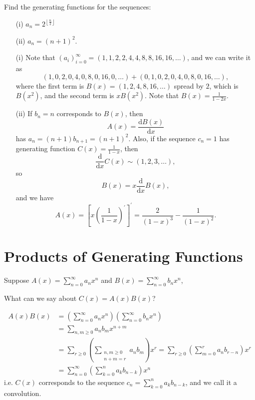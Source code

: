 \begin{eg}
    Find the generating functions for the sequences:
    \begin{itemize}
        \item [(i)] \(a_n = 2^{\left\lfloor \frac{n}{2} \right\rfloor}\)
        \item [(ii)] \(a_n = (n + 1)^2\). 
    \end{itemize}
\end{eg}
\begin{explanation}
    \vphantom{text}
    \begin{itemize}
        \item [(i)] Note that \((a_i)_{i=0}^{\infty} = (1, 1, 2, 2, 4, 4, 8, 8, 16, 16, \dots )\), and we can write it as 
        \[
            (1,0,2,0,4,0,8,0,16,0,\dots ) + (0, 1, 0, 2, 0, 4,0, 8, 0, 16,\dots ),
        \] where the first term is \(B(x) = (1, 2, 4, 8, 16, \dots )\) spread by \(2\), which is \(B \left( x^2 \right) \), and the second term is \(x B \left( x^2 \right) \). Note that \(B(x) = \frac{1}{1 - 2x}\).  
        \item [(ii)] If \(b_n = n\) corresponds to \(B(x)\), then 
        \[
            A(x) = \frac{\mathrm{d}B(x)}{\mathrm{d}x} 
        \] has \(a_n = (n + 1) b_{n+1} = (n+1)^2\). Also, if the sequence \(c_n = 1\) has generating function \(C(x) = \frac{1}{1-x}\), then 
        \[
            \frac{\mathrm{d}}{\mathrm{d}x} C(x) \sim (1,2,3, \dots ),
        \] so 
        \[
           B(x) = x \frac{\mathrm{d}}{\mathrm{d}x} B(x),
        \]
        and we have 
        \[
            A(x) = \left[ x \left( \frac{1}{1 - x} \right)^{\prime}   \right]^{\prime} = \frac{2}{(1-x)^3} - \frac{1}{(1-x)^2}. 
        \]  
    \end{itemize}
\end{explanation}

\section{Products of Generating Functions}
Suppose \(A(x) = \sum_{n=0}^{\infty} a_n x^n \) and \(B(x) = \sum_{n=0}^{\infty}  b_n x^n \),
\begin{question}
    What can we say about \(C(x) = A(x) B(x)\)?  
\end{question}
\begin{align*}
    A(x) B(x) &= \left( \sum_{n=0}^{\infty} a_n x^n  \right) \left( \sum_{n=0}^{\infty} b_n x^n  \right) \\
    &= \sum_{n, m \ge 0} a_n b_m x^{n + m} \\
    &= \sum_{r \ge 0} \left( \sum_{\substack{n, m \ge 0 \\ n + m = r}} a_n b_m  \right) x^r = \sum_{r \ge 0} \left( \sum_{m=0}^r a_n b_{r - n}  \right) x^r \\
    &= \sum_{n=0}^{\infty} \left( \sum_{k=0}^n a_k b_{n - k}  \right) x^n        
\end{align*} 
i.e. \(C(x)\) corresponds to the sequence \(c_n = \sum_{k=0}^n a_k b_{n - k} \), and we call it a convolution. 

